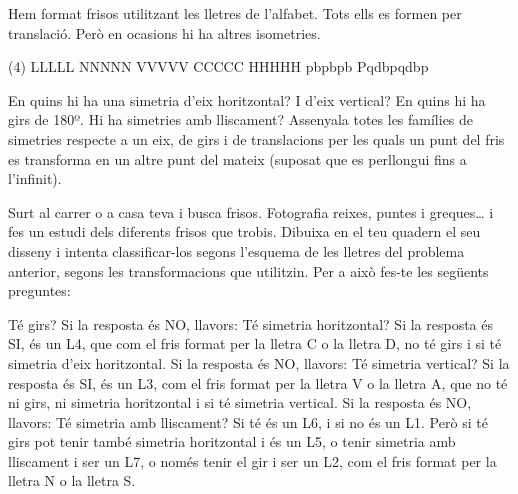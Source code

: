 \begin{mylist}


\exer  Hem format frisos utilitzant les lletres de l'alfabet. Tots ells es formen per translació. Però en ocasions hi ha altres isometries.

\begin{tasks}(4)
\task[L1. ] \quad LLLLL
\task[L2. ] \quad NNNNN
\task[L3. ] \quad VVVVV
\task[L4. ] \quad CCCCC
\task[L5. ] \quad HHHHH
\task[L6. ] \quad pbpbpb
\task[L7. ] \quad Pqdbpqdbp
\end{tasks}

\begin{tasks}
	\task  En quins hi ha una simetria d'eix horitzontal?  I d'eix vertical?     
	\task  En quins hi ha girs de 180º.   
	\task  Hi ha simetries amb lliscament?
	\task  Assenyala totes les famílies de simetries respecte a un eix, de girs i de translacions per les quals un punt del fris es transforma en un altre punt del mateix (suposat que es perllongui fins a l'infinit).
\end{tasks}



\exer \simbolsearch Surt al carrer o a casa teva i busca frisos. Fotografia reixes, puntes i greques{\dots} i fes un estudi dels diferents frisos que trobis. Dibuixa en el teu quadern el seu disseny i intenta classificar-los segons l'esquema de les lletres del problema anterior, segons les transformacions que utilitzin. Per a això fes-te les següents preguntes:

\begin{tasks}
\task Té girs? Si la resposta és NO, llavors:
%
\task Té simetria horitzontal? Si la resposta és SI, és un L4, que com el fris format per la lletra C o la lletra D, no té girs i si té simetria d'eix horitzontal. Si la resposta és NO, llavors:
%
\task Té simetria vertical? Si la resposta és SI, és un L3, com el fris format per la lletra V o la lletra A, que no té ni girs, ni simetria horitzontal i si té simetria vertical. Si la resposta és NO, llavors:
%
\task Té simetria amb lliscament? Si té és un L6, i si no és un L1. Però si té girs pot tenir també simetria horitzontal i és un L5, o tenir simetria amb lliscament i ser un L7, o només tenir el gir i ser un L2, com el fris format per la lletra N o la lletra S. 
 \end{tasks}



\end{mylist}
